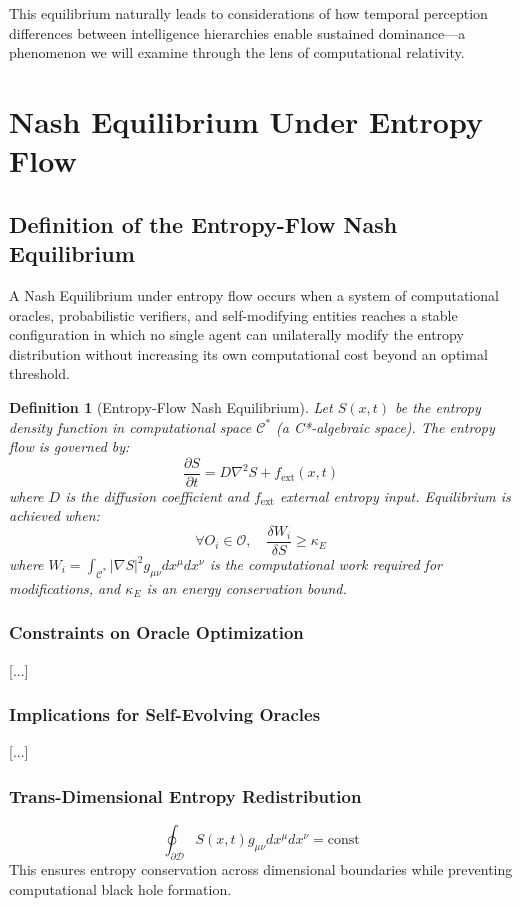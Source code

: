 \documentclass[11pt]{article}
\newtheorem{definition}{Definition}[section]
\begin{document}
This equilibrium naturally leads to considerations of how temporal perception differences between intelligence hierarchies enable sustained dominance—a phenomenon we will examine through the lens of computational relativity.

\section{Nash Equilibrium Under Entropy Flow}
\label{sec:entropy_flow}

\subsection{Definition of the Entropy-Flow Nash Equilibrium}
A Nash Equilibrium under entropy flow occurs when a system of computational oracles, probabilistic verifiers, and self-modifying entities reaches a stable configuration in which no single agent can unilaterally modify the entropy distribution without increasing its own computational cost beyond an optimal threshold.

\begin{definition}[Entropy-Flow Nash Equilibrium]
Let $S(x,t)$ be the entropy density function in computational space $\mathcal{C}^*$ (a C*-algebraic space). The entropy flow is governed by:
\[
\frac{\partial S}{\partial t} = D\nabla^2 S + f_{\text{ext}}(x,t)
\]
where $D$ is the diffusion coefficient and $f_{\text{ext}}$ external entropy input. Equilibrium is achieved when:
\[
\forall O_i \in \mathcal{O},\quad \frac{\delta W_i}{\delta S} \geq \kappa_E
\]
where $W_i = \int_{\mathcal{C}^*} |\nabla S|^2 g_{\mu\nu} dx^\mu dx^\nu$ is the computational work required for modifications, and $\kappa_E$ is an energy conservation bound.
\end{definition}

\subsubsection{Constraints on Oracle Optimization}
[...]

\subsubsection{Implications for Self-Evolving Oracles}
[...]

\subsubsection{Trans-Dimensional Entropy Redistribution}
\[
\oint_{\partial\mathcal{D}} S(x,t)g_{\mu\nu} dx^\mu dx^\nu = \text{const}
\]
This ensures entropy conservation across dimensional boundaries while preventing computational black hole formation.
\end{document}
